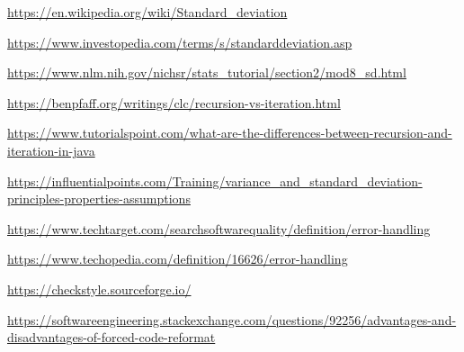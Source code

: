 \documentclass[12pt,a4paper]{report}
\begin{document}
\begin{thebibliography}{15}

\href{https://en.wikipedia.org/wiki/Standard_deviation}{https://en.wikipedia.org/wiki/Standard\_deviation}

\href{https://www.investopedia.com/terms/s/standarddeviation.asp}{https://www.investopedia.com/terms/s/standarddeviation.asp}

\href{https://www.nlm.nih.gov/nichsr/stats\_tutorial/section2/mod8\_sd.html}{https://www.nlm.nih.gov/nichsr/stats\_tutorial/section2/mod8\_sd.html}

\href{https://benpfaff.org/writings/clc/recursion-vs-iteration.html#:~:text=The\%20iterative\%20alternative\%20is\%20to,storage\%20cost\%20of\%20recursive\%20calls.}{https://benpfaff.org/writings/clc/recursion-vs-iteration.html}

\href{https://www.tutorialspoint.com/what-are-the-differences-between-recursion-and-iteration-in-java}{https://www.tutorialspoint.com/what-are-the-differences-between-recursion-and-iteration-in-java}

\href{https://influentialpoints.com/Training/variance_and_standard_deviation-principles-properties-assumptions}{https://influentialpoints.com/Training/variance\_and\_standard\_deviation-principles-properties-assumptions}

\href{https://www.techtarget.com/searchsoftwarequality/definition/error-handling}{https://www.techtarget.com/searchsoftwarequality/definition/error-handling}

\href{https://www.techopedia.com/definition/16626/error-handling}{https://www.techopedia.com/definition/16626/error-handling}

\href{https://checkstyle.sourceforge.io/}{https://checkstyle.sourceforge.io/}

\href{https://softwareengineering.stackexchange.com/questions/92256/advantages-and-disadvantages-of-forced-code-reformat}{https://softwareengineering.stackexchange.com/questions/92256/advantages-and-disadvantages-of-forced-code-reformat}

\end{thebibliography}
\end{document}
